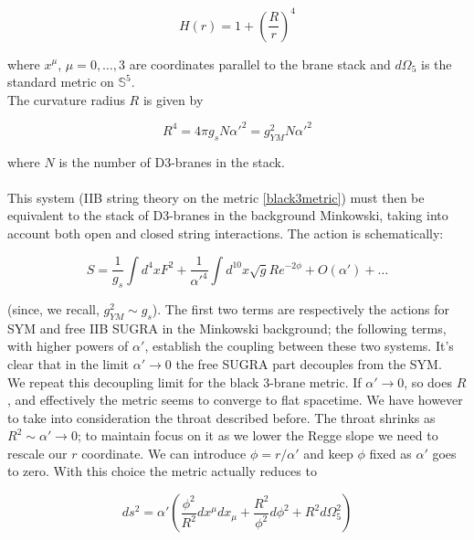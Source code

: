 \begin{equation}
	H(r) = 1 + \left( \frac{R}{r} \right)^4
	\label{}
\end{equation}

where $x^\mu$, $\mu = 0,\ldots,3$ are coordinates parallel to the brane stack and $d\Omega_5$ is the standard metric on $\mathbb{S}^5$.\\

The curvature radius $R$ is given by

\begin{equation}
	R^4 = 4\pi g_s N \alpha'^2 = g_{YM}^2 N \alpha'^2
	\label{}
\end{equation}

where $N$ is the number of D3-branes in the stack.\\

\\

This system (IIB string theory on the metric \ref{black3metric}) must then be equivalent to the stack of D3-branes in the background Minkowski, taking into account both open and closed string interactions. The action is schematically:

\begin{equation}
	S = \frac{1}{g_s} \int d^4 x F^2 + \frac{1}{\alpha'^4} \int d^{10}x \sqrt{g} R e^{-2\phi} + O(\alpha') + \dots
\end{equation}

(since, we recall, $g_{YM}^2 \sim g_s$). The first two terms are respectively the actions for SYM and free IIB SUGRA in the Minkowski background; the following terms, with higher powers of $\alpha'$, establish the coupling between these two systems. It's clear that in the limit $\alpha' \rightarrow 0$ the free SUGRA part decouples from the SYM.\\

We repeat this decoupling limit for the black 3-brane metric. If $\alpha' \rightarrow 0$, so does $R$, and effectively the metric seems to converge to flat spacetime. We have however to take into consideration the throat described before. The throat shrinks as $R^2 \sim \alpha' \rightarrow 0$; to maintain focus on it as we lower the Regge slope we need to rescale our $r$ coordinate. We can introduce $\phi = r/\alpha'$ and keep $\phi$ fixed as $\alpha'$ goes to zero. With this choice the metric actually reduces to

\begin{equation}
	ds^2 = \alpha' \left( \frac{\phi^2 }{R^2}dx^\mu dx_\mu + \frac{R^2}{\phi^2} d\phi^2 + R^2 d\Omega_5^2 \right)
	\label{}
\end{equation}

